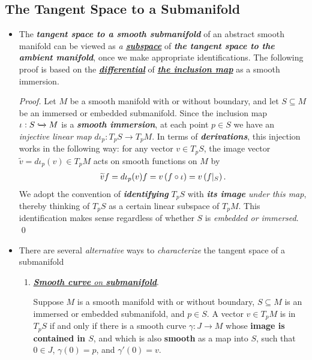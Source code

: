 \documentclass[11pt]{article}
\begin{document}
\subsection{The Tangent Space to a Submanifold}
\begin{itemize}
\item \begin{remark}
The \emph{\textbf{tangent space to a smooth submanifold}} of an abstract smooth manifold can be viewed as \emph{a \underline{\textbf{subspace}}} of \emph{\textbf{the tangent space to the ambient manifold}}, once we make appropriate identifications. The following proof is based on the \underline{\emph{\textbf{differential}}} of \underline{\emph{\textbf{the inclusion map}}} as a smooth immersion.
\end{remark}
 \begin{proof} 
Let $M$ be a smooth manifold with or without boundary, and let $S\subseteq M$ be an immersed or embedded submanifold. Since the inclusion map $\iota: S \xhookrightarrow{} M$ is a \emph{\textbf{smooth immersion}}, at each point $p \in S$ we have an \emph{injective linear map} $d\iota_{p}: T_{p}S \rightarrow T_{p}M$.
In terms of \emph{\textbf{derivations}}, this injection works in the following way: for any vector $v \in T_{p}S$, the image vector $\widetilde{v} = d\iota_{p}(v) \in T_{p}M$ acts on smooth functions on $M$ by
\begin{align*}
\widetilde{v}f = d\iota_{p}(v)f = v\left(f \circ \iota\right) = v\left(f|_{S}\right).
\end{align*}
We adopt the convention of \emph{\textbf{identifying}} $T_{p}S$ with \emph{\textbf{its image} under this map}, thereby
thinking of $T_{p}S$ as a certain linear subspace of $T_{p}M$. This identification makes sense regardless of whether $S$ is \emph{embedded or immersed}. \qed
\end{proof}

\item There are several \emph{alternative} ways to \emph{characterize} the tangent space of a submanifold 
\begin{enumerate}
\item \underline{\emph{\textbf{Smooth curve} on \textbf{submanifold}}}. 
\begin{proposition}
Suppose $M$ is a smooth manifold with or without boundary, $S\subseteq M$ is an immersed or embedded submanifold, and $p \in S$. A vector $v \in T_{p}M$ is
in $T_{p}S$ if and only if there is a smooth curve  $\gamma: J \rightarrow M$ whose \textbf{image is contained in $S$}, and which is also \textbf{smooth} as a map into $S$, such that $0 \in J$, $\gamma(0) = p$, and $\gamma'(0) = v$.
\end{proposition}


\end{enumerate}
\end{itemize}
\end{document}
